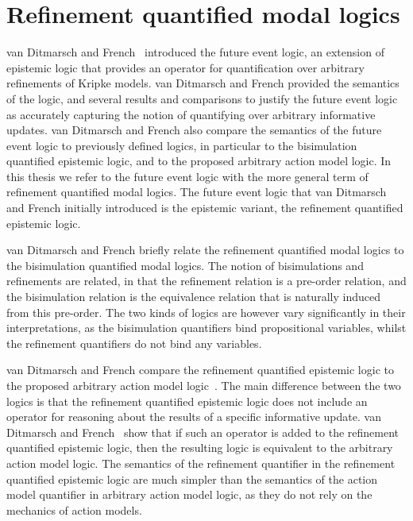 \section{Refinement quantified modal logics}

van Ditmarsch and French~\cite{french2009simulation} introduced the future event
logic, an extension of epistemic logic that provides an operator for
quantification over arbitrary refinements of Kripke models. van Ditmarsch and
French provided the semantics of the logic, and several results and comparisons
to justify the future event logic as accurately capturing the notion of
quantifying over arbitrary informative updates. van Ditmarsch and French also
compare the semantics of the future event logic to previously defined logics, in
particular to the bisimulation quantified epistemic logic, and to the proposed
arbitrary action model logic. In this thesis we refer to the future event logic
with the more general term of refinement quantified modal logics. The future
event logic that van Ditmarsch and French initially introduced is the epistemic
variant, the refinement quantified epistemic logic.

van Ditmarsch and French briefly relate the refinement quantified modal logics
to the bisimulation quantified modal logics. The notion of bisimulations and
refinements are related, in that the refinement relation is a pre-order
relation, and the bisimulation relation is the equivalence relation that is
naturally induced from this pre-order. The two kinds of logics are however vary
significantly in their interpretations, as the bisimulation quantifiers bind
propositional variables, whilst the refinement quantifiers do not bind any
variables. %

van Ditmarsch and French compare the refinement quantified epistemic logic to
the proposed arbitrary action model logic~\cite{french2009simulation}. The main
difference between the two logics is that the refinement quantified epistemic
logic does not include an operator for reasoning about the results of a specific
informative update. van Ditmarsch and French~\cite{french2009simulation} show
that if such an operator is added to the refinement quantified epistemic logic,
then the resulting logic is equivalent to the arbitrary action model logic. The
semantics of the refinement quantifier in the refinement quantified epistemic
logic are much simpler than the semantics of the action model quantifier in
arbitrary action model logic, as they do not rely on the mechanics of action
models.

